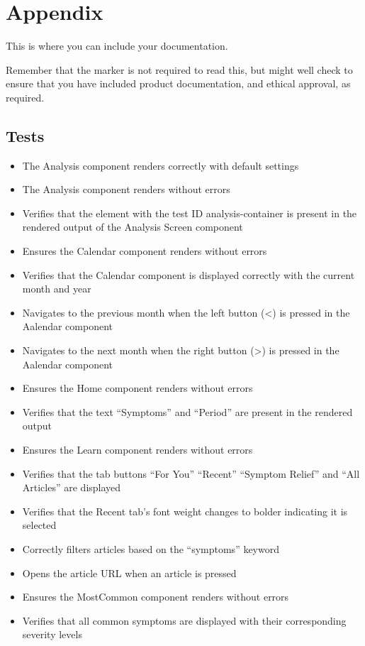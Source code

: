 \section{Appendix}

This is where you can include your documentation.

Remember that the marker is not required to read this, but might well check to ensure that you have included product documentation, and ethical approval, as required.
\subsection{Tests}
\begin{itemize}
  \item The Analysis component renders correctly with default settings
  \item The Analysis component renders without errors
  \item Verifies that the element with the test ID analysis-container is present in the rendered output of the Analysis Screen component
  \item Ensures the Calendar component renders without errors
  \item Verifies that the Calendar component is displayed correctly with the current month and year
  \item Navigates to the previous month when the left button (<) is pressed in the Aalendar component
  \item Navigates to the next month when the right button (>) is pressed in the Aalendar component
  \item Ensures the Home component renders without errors
  \item Verifies that the text ``Symptoms'' and ``Period'' are present in the rendered output
  \item Ensures the Learn component renders without errors
  \item Verifies that the tab buttons ``For You'' ``Recent'' ``Symptom Relief'' and ``All Articles'' are displayed
  \item Verifies that the Recent tab's font weight changes to bolder indicating it is selected
  \item Correctly filters articles based on the ``symptoms'' keyword
  \item Opens the article URL when an article is pressed
  \item Ensures the MostCommon component renders without errors
  \item Verifies that all common symptoms are displayed with their corresponding severity levels

\end{itemize}
